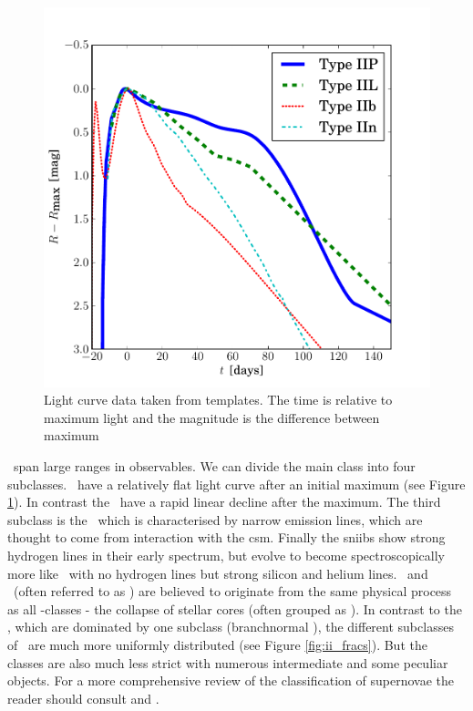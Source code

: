 \begin{figure}[tb] %
   \centering
   \includegraphics[width=\textwidth]{chapter_intro/plots/plot_li11_lc_type2.pdf} 
   \caption[Light curve templates from \citet{2011MNRAS.412.1441L}]{Light curve data taken from \citet{2011MNRAS.412.1441L} templates. The time is relative to maximum light and the magnitude is the difference between maximum  }
   \label{fig:snii_lc}
\end{figure}

\sneii\ span large ranges in observables. We can divide the main class into four subclasses. \sneiip\ have a relatively flat light curve after an initial maximum (see Figure \ref{fig:snii_lc}). In contrast the \sneiil\ have a rapid linear decline after the maximum. The third subclass is the \sniin\ which is characterised by narrow emission lines, which are thought to come from interaction with the \gls{csm}. Finally the \glspl{sniib} show strong hydrogen lines in their early spectrum, but evolve to become spectroscopically more like \sneib\ with no hydrogen lines but strong silicon and helium lines. \sneib\ and \sneic\ (often referred to as \sneibc) are believed to originate from the same physical process as all \snii-classes - the collapse of stellar cores (often grouped as \sniiibc). In contrast to the \sneia, which are dominated by one subclass (\gls{branchnormal} \sneia), the different subclasses of \sneii\ are much more uniformly distributed (see Figure \ref{fig:ii_fracs}). But the classes are also much less strict with numerous intermediate and some peculiar objects. For a more comprehensive review of the classification of supernovae the reader should consult \citet{2003LNP...598...21T} and \citet{2007AIPC..937..187T}.

